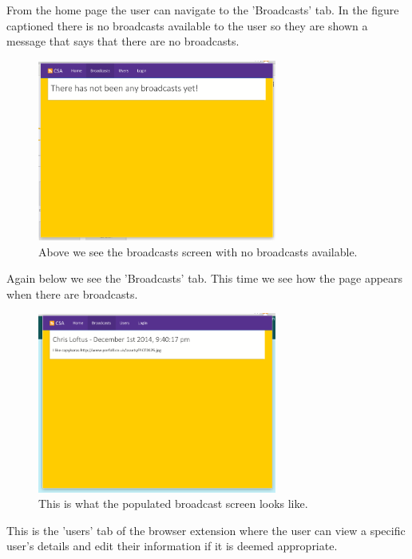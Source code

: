 \documentclass{article}
\begin{document}
\newpage
From the home page the user can navigate to the 'Broadcasts' tab. In the figure captioned there is no broadcasts available to the user so they are shown a message that says that there are no broadcasts.\\

\begin{figure}[H]
\centering
\includegraphics[width=0.7\textwidth]{bcpage}
\caption{Above we see the broadcasts screen with no broadcasts available.}
\end{figure}

Again below we see the 'Broadcasts' tab. This time we see how the page appears when there are broadcasts.

\begin{figure}[H]
\centering
\includegraphics[width=0.7\textwidth]{populatebcpage}
\caption{This is what the populated broadcast screen looks like.}
\end{figure}

This is the 'users' tab of the browser extension where the user can view a specific user's details and edit their information if it is deemed appropriate.
\end{document}
